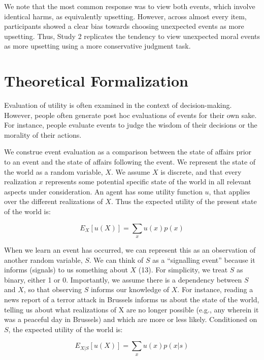 \documentclass[9pt,twocolumn,twoside,]{pnas-new}
\begin{document}
{We note that the most common response was to view both events, which
involve identical harms, as equivalently upsetting. However, across
almost every item, participants showed a clear bias towards choosing
unexpected events as more upsetting. Thus, Study 2 replicates the
tendency to view unexpected moral events as more upsetting using a more
conservative judgment task.

\section*{Theoretical Formalization}\label{theory}

Evaluation of utility is often examined in the context of
decision-making. However, people often generate post hoc evaluations of
events for their own sake. For instance, people evaluate events to judge
the wisdom of their decisions or the morality of their actions.

We construe event evaluation as a comparison between the state of
affairs prior to an event and the state of affairs following the event.
We represent the state of the world as a random variable, \(X\). We
assume \(X\) is discrete, and that every realization \(x\) represents
some potential specific state of the world in all relevant aspects under
consideration. An agent has some utility function \(u\), that applies
over the different realizations of \(X\). Thus the expected utility of
the present state of the world is:

\begin{equation*}
E_X[u(X)] = \sum_x u(x)p(x)
\end{equation*}

When we learn an event has occurred, we can represent this as an
observation of another random variable, \(S\). We can think of \(S\) as
a ``signalling event'' because it informs (signals) to us something
about \(X\) (13). For simplicity, we treat \(S\) as binary, either 1 or
0. Importantly, we assume there is a dependency between \(S\) and \(X\),
so that observing \(S\) informs our knowledge of \(X\). For instance,
reading a news report of a terror attack in Brussels informs us about
the state of the world, telling us about what realizations of X are no
longer possible (e.g., any wherein it was a peaceful day in Brussels)
and which are more or less likely. Conditioned on \(S\), the expected
utility of the world is:

\begin{equation*}
E_{X|S}[u(X)] = \sum_x u(x)p(x|s)
\end{equation*}

}
\end{document}
